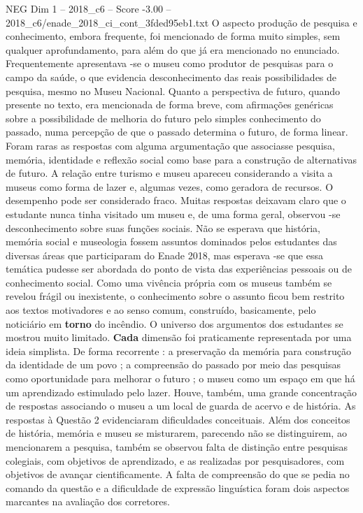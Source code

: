 \begin{textsample}{NEG Dim 1 – 2018\_c6 – Score -3.00 – 2018\_c6/enade\_2018\_ci\_cont\_3fded95eb1.txt}
O aspecto produção de pesquisa e conhecimento, embora frequente, foi mencionado de forma muito simples, sem qualquer aprofundamento, para além do que já era mencionado no enunciado.
Frequentemente apresentava -se o museu como produtor de pesquisas para o campo da saúde, o que evidencia desconhecimento das reais possibilidades de pesquisa, mesmo no Museu Nacional.
Quanto a perspectiva de futuro, quando presente no texto, era mencionada de forma breve, com afirmações genéricas sobre a possibilidade de melhoria do futuro pelo simples conhecimento do passado, numa percepção de que o passado determina o futuro, de forma linear.
Foram raras as respostas com alguma argumentação que associasse pesquisa, memória, identidade e reflexão social como base para a construção de alternativas de futuro.
A relação entre turismo e museu apareceu considerando a visita a museus como forma de lazer e, algumas vezes, como geradora de recursos.
O desempenho pode ser considerado fraco.
Muitas respostas deixavam claro que o estudante nunca tinha visitado um museu e, de uma forma geral, observou -se desconhecimento sobre suas funções sociais.
Não se esperava que história, memória social e museologia fossem assuntos dominados pelos estudantes das diversas áreas que participaram do Enade 2018, mas esperava -se que essa temática pudesse ser abordada do ponto de vista das experiências pessoais ou de conhecimento social.
Como uma vivência própria com os museus também se revelou frágil ou inexistente, o conhecimento sobre o assunto ficou bem restrito aos textos motivadores e ao senso comum, construído, basicamente, pelo noticiário em \textbf{torno} do incêndio.
O universo dos argumentos dos estudantes se mostrou muito limitado. \textbf{Cada} dimensão foi praticamente representada por uma ideia simplista.
De forma recorrente : a preservação da memória para construção da identidade de um povo ; a compreensão do passado por meio das pesquisas como oportunidade para melhorar o futuro ; o museu como um espaço em que há um aprendizado estimulado pelo lazer.
Houve, também, uma grande concentração de respostas associando o museu a um local de guarda de acervo e de história.
As respostas à Questão 2 evidenciaram dificuldades conceituais.
Além dos conceitos de história, memória e museu se misturarem, parecendo não se distinguirem, ao mencionarem a pesquisa, também se observou falta de distinção entre pesquisas colegiais, com objetivos de aprendizado, e as realizadas por pesquisadores, com objetivos de avançar cientificamente.
A falta de compreensão do que se pedia no comando da questão e a dificuldade de expressão linguística foram dois aspectos marcantes na avaliação dos corretores.

\end{textsample}
